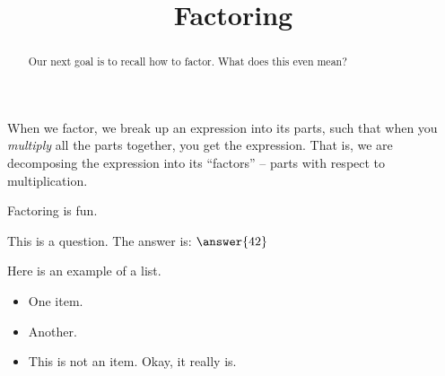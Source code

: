\documentclass{ximera}
\begin{document}
\title{Factoring}

\begin{abstract}
Our next goal is to recall how to factor.  What does this even mean?
\end{abstract}
\maketitle



When we factor, we break up an expression into its parts, such that when you \emph{multiply} all the parts together, you get the expression.    That is, we are decomposing the expression into its ``factors'' -- parts with respect to multiplication.


\begin{theorem}
Factoring is fun.
\end{theorem}

\begin{question}
This is a question.  The answer is: $\answer{42}$
\end{question}

\begin{example}
Here is an example of a list.
\begin{itemize}
\item One item.
\item Another.
\item This is not an item.  Okay, it really is.
\end{itemize}
\end{example}
\end{document}
